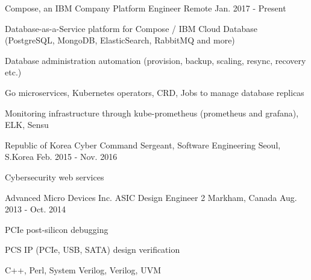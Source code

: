 

\begin{cventries}

  \cventry
    {Compose, an IBM Company} %
    {Platform Engineer} %
    {Remote} %
    {Jan. 2017 - Present} %
    {
      \begin{cvitems} %
        \item {Database-as-a-Service platform for Compose / IBM Cloud Database (PostgreSQL, MongoDB, ElasticSearch, RabbitMQ and more)}
        \item {Database administration automation (provision, backup, scaling, resync, recovery etc.)}
        \item {Go microservices, Kubernetes operators, CRD, Jobs to manage database replicas}
        \item {Monitoring infrastructure through kube-prometheus (prometheus and grafana), ELK, Sensu}
      \end{cvitems}
    }

  \cventry
    {Republic of Korea Cyber Command} %
    {Sergeant, Software Engineering} %
    {Seoul, S.Korea} %
    {Feb. 2015 - Nov. 2016} %
    {
      \begin{cvitems} %
        \item {Cybersecurity web services}
      \end{cvitems}
    }

  \cventry
    {Advanced Micro Devices Inc.} %
    {ASIC Design Engineer 2} %
    {Markham, Canada} %
    {Aug. 2013 - Oct. 2014} %
    {
      \begin{cvitems} %
        \item {PCIe post-silicon debugging}
        \item {PCS IP (PCIe, USB, SATA) design verification}
        \item {C++, Perl, System Verilog, Verilog, UVM}
      \end{cvitems}
    }


\end{cventries}
